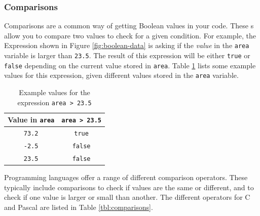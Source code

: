 \clearpage
\subsubsection{Comparisons} %
\label{sub:comparisons}

Comparisons are a common way of getting Boolean values in your code. These s allow you to compare two values to check for a given condition. For example, the Expression shown in Figure \ref{fig:boolean-data} is asking if the \emph{value} in the \texttt{area} variable is larger than \texttt{23.5}. The result of this expression will be either \texttt{true} or \texttt{false} depending on the current value stored in \texttt{area}. Table \ref{tbl:bool-expr-sample} lists some example values for this expression, given different values stored in the \texttt{area} variable.

\begin{table}[h]
  \centering
  \begin{tabular}{|c|c|}
    \hline
    \textbf{Value in \texttt{area}} & \textbf{\texttt{area > 23.5}} \\
    \hline
    \texttt{73.2} & \texttt{true} \\
    \hline
    \texttt{-2.5} & \texttt{false} \\
    \hline
    \texttt{23.5} & \texttt{false} \\
    \hline
  \end{tabular}
  \caption{Example values for the expression \texttt{area > 23.5}}
  \label{tbl:bool-expr-sample}
\end{table}

Programming languages offer a range of different comparison operators. These typically include comparisons to check if values are the same or different, and to check if one value is larger or small than another. The different operators for C and Pascal are listed in Table \ref{tbl:comparisons}.

